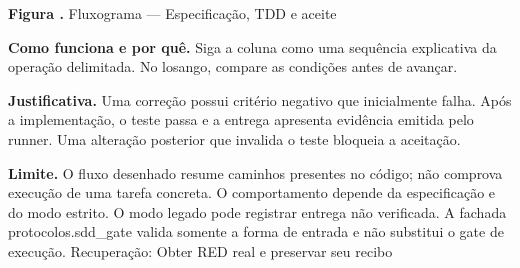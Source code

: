 {\small\textbf{Figura \thefigure.} Fluxograma --- Especificação, TDD e aceite}\par\smallskip
\noindent\textbf{Como funciona e por quê.} Siga a coluna como uma sequência explicativa da operação delimitada. No losango, compare as condições antes de avançar.\par
\noindent\textbf{Justificativa.} Uma correção possui critério negativo que inicialmente falha. Após a implementação, o teste passa e a entrega apresenta evidência emitida pelo runner. Uma alteração posterior que invalida o teste bloqueia a aceitação.\par
\noindent\textbf{Limite.} O fluxo desenhado resume caminhos presentes no código; não comprova execução de uma tarefa concreta. O comportamento depende da especificação e do modo estrito. O modo legado pode registrar entrega não verificada. A fachada protocolos.sdd\_gate valida somente a forma de entrada e não substitui o gate de execução. Recuperação: Obter RED real e preservar seu recibo\par\smallskip
{}
